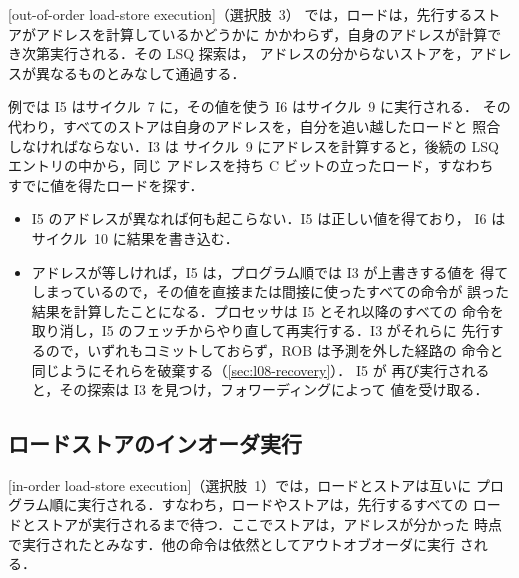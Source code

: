 \documentclass[../main.tex]{subfiles}
\begin{document}
\begin{definition}[ロードストアのアウトオブオーダ実行]
  \label{def:l09-ooo}
  [out-of-order load-store execution]（選択肢~3）
  では，ロードは，先行するストアがアドレスを計算しているかどうかに
  かかわらず，自身のアドレスが計算でき次第実行される．その LSQ 探索は，
  アドレスの分からないストアを，アドレスが異なるものとみなして通過する．
\end{definition}

例では I5 はサイクル~7 に，その値を使う I6 はサイクル~9 に実行される．
その代わり，すべてのストアは自身のアドレスを，自分を追い越したロードと
照合しなければならない．I3 は
サイクル~9 にアドレスを計算すると，後続の LSQ エントリの中から，同じ
アドレスを持ち C ビットの立ったロード，すなわち
すでに値を得たロードを探す．
\begin{itemize}
  \item I5 のアドレスが異なれば何も起こらない．I5 は正しい値を得ており，
    I6 はサイクル~10 に結果を書き込む．
  \item アドレスが等しければ，I5 は，プログラム順では I3 が上書きする値を
    得てしまっているので，その値を直接または間接に使ったすべての命令が
    誤った結果を計算したことになる．プロセッサは I5 とそれ以降のすべての
    命令を取り消し，I5 のフェッチからやり直して再実行する．I3 がそれらに
    先行するので，いずれもコミットしておらず，ROB は予測を外した経路の
    命令と同じようにそれらを破棄する（\cref{sec:l08-recovery}）．
    I5 が
    再び実行されると，その探索は I3 を見つけ，フォワーディングによって
    値を受け取る．
\end{itemize}

\subsection{ロードストアのインオーダ実行}

\begin{definition}[ロードストアのインオーダ実行]
  \label{def:l09-in-order}
  [in-order load-store execution]（選択肢~1）では，ロードとストアは互いに
  プログラム順に実行される．すなわち，ロードやストアは，先行するすべての
  ロードとストアが実行されるまで待つ．ここでストアは，アドレスが分かった
  時点で実行されたとみなす．他の命令は依然としてアウトオブオーダに実行
  される．
\end{definition}
\end{document}
